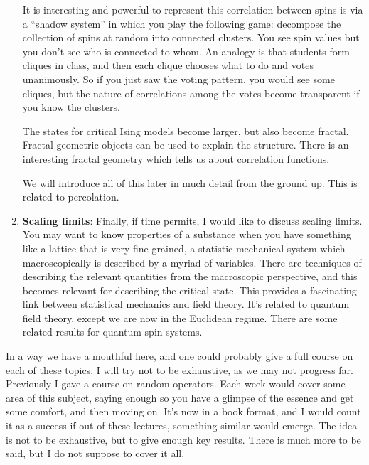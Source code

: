 \documentclass[12pt]{book}
\theoremstyle{norm}
\begin{document}
\begin{enumerate}
It is interesting and powerful to represent this correlation between spins is via a ``shadow system'' in which you play the following game: decompose the collection of spins at random into connected clusters. You see spin values but you don't see who is connected to whom. %
An analogy is that students form cliques in class, and then each clique chooses what to do and votes unanimously. So if you just saw the voting pattern, you would see some cliques, but the nature of correlations among the votes become transparent if you know the clusters. 

The states for critical Ising models become larger, but also become fractal. Fractal geometric objects can be used to explain the structure. There is an interesting fractal geometry which tells us about correlation functions.

We will introduce all of this later in much detail from the ground up. This is related to percolation.

\item \textbf{Scaling limits}: Finally, if time permits, I would like to discuss scaling limits. You may want to know properties of a substance when you have something like a lattice that is very fine-grained, a statistic mechanical system which macroscopically is described by a myriad of variables. There are techniques of describing the relevant quantities from the macroscopic perspective, and this becomes relevant for describing the critical state. This provides a fascinating link between statistical mechanics and field theory. It's related to quantum field theory, except we are now in the Euclidean regime. There are some related results for quantum spin systems. 


\end{enumerate}

In a way we have a mouthful here, and one could probably give a full course on each of these topics. I will try not to be exhaustive, as we may not progress far. Previously I gave a course on random operators. Each week would cover some area of this subject, saying enough so you have a glimpse of the essence and get some comfort, and then moving on. It's now in a book format, and I would count it as a success if out of these lectures, something similar would emerge. The idea is not to be exhaustive, but to give enough key results. There is much more to be said, but I do not suppose to cover it all.
\end{document}
